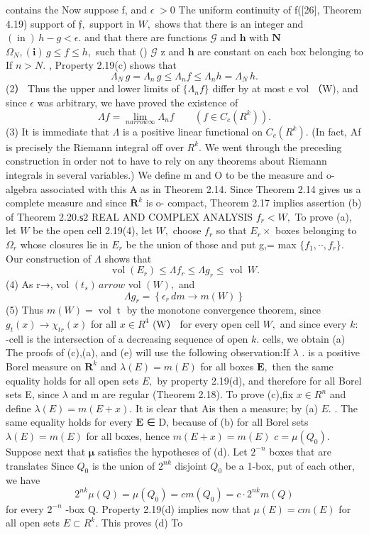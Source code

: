 contains the Now suppose f, and $\scriptstyle\epsilon\;>0$ The uniform continuity of f([26], Theorem 4.19) support of ${\mathfrak{f}},$ support in $W,$ shows that there is an integer and $({\operatorname{in}})\,h-g<\epsilon.$ and that there are functions $\scriptstyle{\mathcal{G}}$ and $\boldsymbol{h}$ with ${\boldsymbol{N}}$ $\Omega_{N},(\mathbf{i})\,g\leq f\leq h,$ such that () $\scriptstyle{\mathcal{G}}$ z and ${\boldsymbol{h}}$ are constant on each box belonging to If $n>N.$ , Property 2.19(c) shows that $$ \Lambda_{N}\,g=\Lambda_{n}\,g\leq\Lambda_{n}f\leq\Lambda_{n}h=\Lambda_{N}\,h. $$ (2） Thus the upper and lower limits of $\{\Lambda_{n}f\}$ differ by at most e vol （W), and since $\textstyle{\epsilon}$ was arbitrary, we have proved the existence of $$ \Lambda f=\operatorname*{lim}_{n arrow\infty}\Lambda_{n}f\qquad(f\in C_{c}(R^{k})). $$ (3) It is immediate that $\Lambda$ is a positive linear functional on $C_{c}(R^{k}).$ (In fact, Af is precisely the Riemann integral off over $R^{k}.$ We went through the preceding construction in order not to have to rely on any theorems about Riemann integrals in several variables.) We define m and O to be the measure and o-algebra associated with this A as in Theorem 2.14. Since Theorem 2.14 gives us a complete measure and since ${\boldsymbol{R}}^{k}$ is o- compact, Theorem 2.17 implies assertion (b) of Theorem 2.20.${\mathsf{s}}2$ REAL AND COMPLEX ANALYSIS $f_{r}<W,$ To prove (a), let $\textstyle W$ be the open cell 2.19(4), let $W,$ choose $f_{r}$ so that $\scriptstyle{E_{r}\times}$ boxes belonging to $\Omega_{r}$ whose closures lie in $E_{r}$ be the union of those and put g,= max $\{f_{1},\cdot\cdot,f_{r}\}.$ Our construction of $\Lambda$ shows that $$ \operatorname{vol}\left(E_{r}\right)\leq\Lambda f_{r}\leq\Lambda g_{r}\leq\operatorname{vol}\ W. $$ (4) As r→, vol $\scriptstyle(t_{s})\, arrow$ vol $(W),$ and $$ \Lambda g_{r}=\left\{\epsilon_{r}\,d m\to m(W)\right\} $$ (5) Thus $m(W)=\operatorname{vol}\operatorname{t}$ by the monotone convergence theorem, since $g_{t}(x)\to\chi_{t r}(x)$ for all $x\in R^{4}$ (W） for every open cell $W,$ and since every $k{\mathrm{:}}$ -cell is the intersection of a decreasing sequence of open $k.$ cells, we obtain (a) The proofs of (c),(a), and (e) will use the following observation:If $\lambda$ . is a positive Borel measure on ${\boldsymbol{R}}^{k}$ and $\lambda(E)=m(E)$ for all boxes ${\boldsymbol{E}},$ then the same equality holds for all open sets $E,$ by property 2.19(d), and therefore for all Borel sets E, since $\lambda$ and m are regular (Theorem 2.18). To prove (c),fix $x\in R^{n}$ and define $\lambda(E)=m(E+x).$ It is clear that Ais then a measure; by (a) $\textstyle E.$ . The same equality holds for every $\boldsymbol{E}$ ∈ D, because of (b) for all Borel sets $\lambda(E)=m(E)$ for all boxes, hence $m(E+x)=m(E)$ $c=\mu(Q_{0}).$ Suppose next that ${\boldsymbol{\mu}}$ satisfies the hypotheses of (d). Let $2^{-n}$ boxes that are translates Since $Q_{0}$ is the union of $2^{n k}$ disjoint $Q_{0}$ be a 1-box, put of each other, we have $$ 2^{n k}\mu(Q)=\mu(Q_{0})=c m(Q_{0})=c\cdot2^{n k}m(Q) $$ for every $2^{-n}$ -box Q. Property 2.19(d) implies now that $\mu(E)=c m(E)$ for all open sets $E\subset R^{k}.$ This proves (d) To 